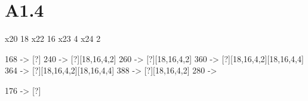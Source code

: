 \section*{A1.4}

x20 18
x22 16
x23 4
x24 2

168 -> [?]
240 -> [?][18,16,4,2]
260 -> [?][18,16,4,2]
360 -> [?][18,16,4,2][18,16,4,4]
364 -> [?][18,16,4,2][18,16,4,4]
388 -> [?][18,16,4,2]
280 -> 

176 -> [?]